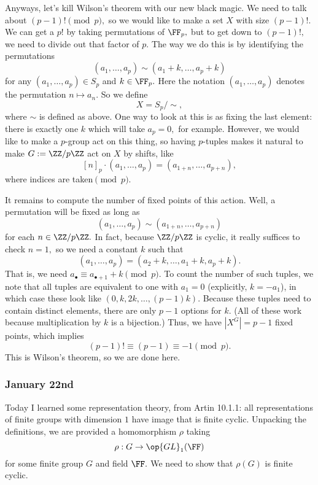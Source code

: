 Anyways, let's kill Wilson's theorem with our new black magic. We need to talk about $(p-1)!\pmod p,$ so we would like to make a set $X$ with size $(p-1)!.$ We can get a $p!$ by taking permutations of $\FF_p,$ but to get down to $(p-1)!,$ we need to divide out that factor of $p.$ The way we do this is by identifying the permutations
\[(a_1,\ldots,a_p)\sim(a_1+k,\ldots,a_p+k)\]
for any $(a_1,\ldots,a_p)\in S_p$ and $k\in\FF_p.$ Here the notation $(a_1,\ldots,a_p)$ denotes the permutation $n\mapsto a_n.$ So we define
\[X=S_p/\sim,\]
where $\sim$ is defined as above. One way to look at this is as fixing the last element: there is exactly one $k$ which will take $a_p=0,$ for example. However, we would like to make a $p$-group act on this thing, so having $p$-tuples makes it natural to make $G:=\ZZ/p\ZZ$ act on $X$ by shifts, like
\[[n]_p\cdot(a_1,\ldots,a_p)=(a_{1+n},\ldots,a_{p+n}),\]
where indices are taken$\pmod p.$

It remains to compute the number of fixed points of this action. Well, a permutation will be fixed as long as
\[(a_1,\ldots,a_p)\sim(a_{1+n},\ldots,a_{p+n})\]
for each $n\in\ZZ/p\ZZ.$ In fact, because $\ZZ/p\ZZ$ is cyclic, it really suffices to check $n=1,$ so we need a constant $k$ such that
\[(a_1,\ldots,a_p)=(a_2+k,\ldots,a_1+k,a_p+k).\]
That is, we need $a_\bullet\equiv a_{\bullet+1}+k\pmod p.$ To count the number of such tuples, we note that all tuples are equivalent to one with $a_1=0$ (explicitly, $k=-a_1$), in which case these look like $(0,k,2k,\ldots,(p-1)k).$ Because these tuples need to contain distinct elements, there are only $p-1$ options for $k.$ (All of these work because multiplication by $k$ is a bijection.) Thus, we have $\left|X^G\right|=p-1$ fixed points, which implies
\[(p-1)!\equiv(p-1)\equiv-1\pmod p.\]
This is Wilson's theorem, so we are done here.

\subsubsection{January 22nd}
Today I learned some representation theory, from Artin 10.1.1: all representations of finite groups with dimension $1$ have image that is finite cyclic. Unpacking the definitions, we are provided a homomorphism $\rho$ taking
\[\rho:G\to\op{GL}_1(\FF)\]
for some finite group $G$ and field $\FF.$ We need to show that $\rho(G)$ is finite cyclic.

